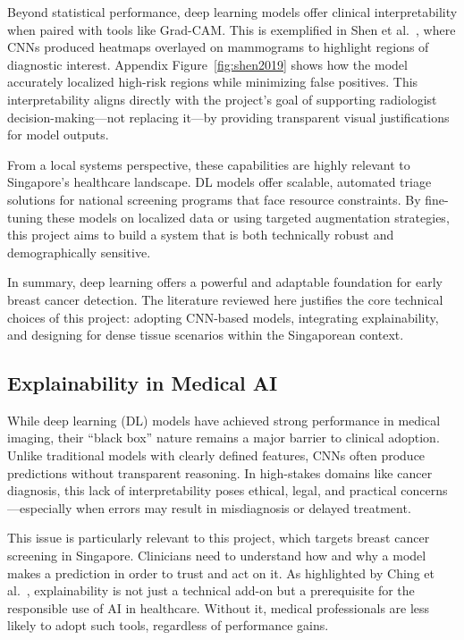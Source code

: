 \documentclass[12pt]{article}
\begin{document}
Beyond statistical performance, deep learning models offer clinical interpretability when paired with tools like Grad-CAM. This is exemplified in Shen et al.~\cite{7}, where CNNs produced heatmaps overlayed on mammograms to highlight regions of diagnostic interest. Appendix Figure~\ref{fig:shen2019} shows how the model accurately localized high-risk regions while minimizing false positives. This interpretability aligns directly with the project’s goal of supporting radiologist decision-making—not replacing it—by providing transparent visual justifications for model outputs.

From a local systems perspective, these capabilities are highly relevant to Singapore’s healthcare landscape. DL models offer scalable, automated triage solutions for national screening programs that face resource constraints. By fine-tuning these models on localized data or using targeted augmentation strategies, this project aims to build a system that is both technically robust and demographically sensitive.

In summary, deep learning offers a powerful and adaptable foundation for early breast cancer detection. The literature reviewed here justifies the core technical choices of this project: adopting CNN-based models, integrating explainability, and designing for dense tissue scenarios within the Singaporean context.

\subsection{Explainability in Medical AI}

While deep learning (DL) models have achieved strong performance in medical imaging, their “black box” nature remains a major barrier to clinical adoption. Unlike traditional models with clearly defined features, CNNs often produce predictions without transparent reasoning. In high-stakes domains like cancer diagnosis, this lack of interpretability poses ethical, legal, and practical concerns—especially when errors may result in misdiagnosis or delayed treatment.

This issue is particularly relevant to this project, which targets breast cancer screening in Singapore. Clinicians need to understand how and why a model makes a prediction in order to trust and act on it. As highlighted by Ching et al.~\cite{3}, explainability is not just a technical add-on but a prerequisite for the responsible use of AI in healthcare. Without it, medical professionals are less likely to adopt such tools, regardless of performance gains.
\end{document}
